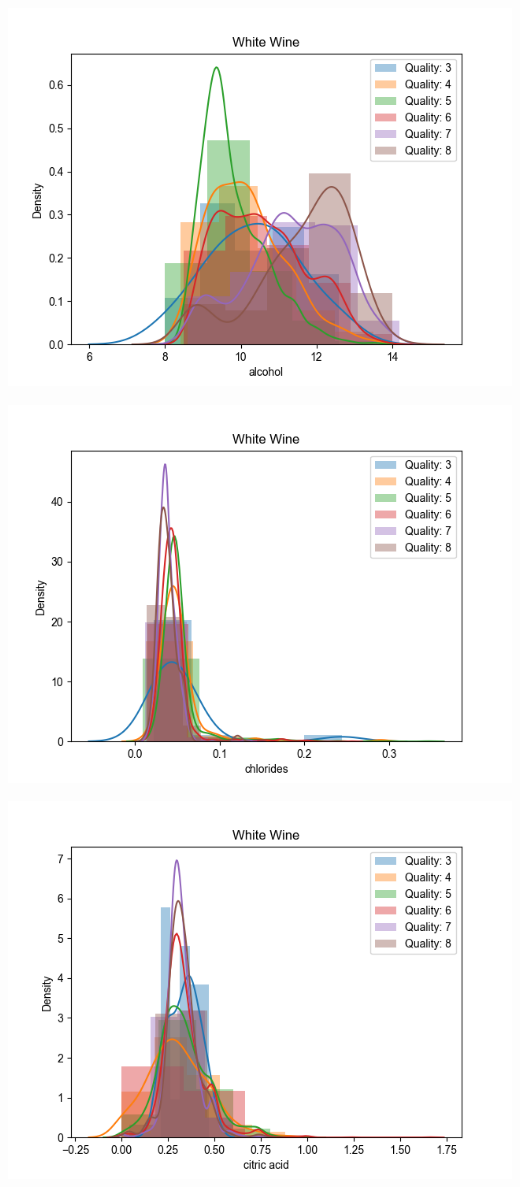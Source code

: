 \documentclass[12pt, letterpaper]{article}
\begin{document}
\includegraphics[scale=\myscale]{white_quality_dist_alcohol.png}

\includegraphics[scale=\myscale]{white_quality_dist_chlorides.png}

\includegraphics[scale=\myscale]{white_quality_dist_citric_acid.png}
\end{document}
